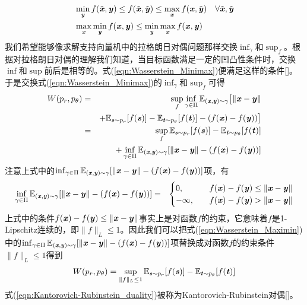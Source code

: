 \begin{eqnarray}
&\min_{\Vy} f(\tilde{\Vx},\Vy) \leq f(\tilde{\Vx},\tilde{\Vy}) \leq \max_{\Vx} f(\Vx,\tilde{\Vy}) \quad \forall \tilde{\Vx},\tilde{\Vy} \\
&\max_{\Vx}\min_{\Vy} f(\Vx,\Vy) \leq \min_{\Vy}\max_{\Vx} f(\Vx,\Vy)
\end{eqnarray}
我们希望能够像求解支持向量机中的拉格朗日对偶问题那样交换$\inf_{\gamma}$和$\sup_{f}$。根据对拉格朗日对偶的理解我们知道，当目标函数满足一定的凹凸性条件时，交换$\inf$和$\sup$前后是相等的。式(\ref{eqn:Wasserstein_Minimax})便满足这样的条件[\cite{Villani07p}]。于是交换式(\ref{eqn:Wasserstein_Minimax})的$\inf_{\gamma}$和$\sup_{f}$可得
\begin{eqnarray}
W(p_{r},p_{\theta})
&=&  \sup_{f} \inf_{\gamma\in\Pi}\SetE_{(\Vx,\Vy)\sim\gamma}\big{[}\|\Vx-\Vy\| \nonumber\\ 
&& + \SetE_{\Vs\sim p_{r}}[f(\Vs)] - \SetE_{\Vt\sim p_{\theta}}[f(\Vt)] - (f(\Vx)-f(\Vy))\big{]}\\
&=& \sup_{f} \SetE_{\Vs\sim p_{r}}[f(\Vs)] - \SetE_{\Vt\sim p_{\theta}}[f(\Vt)] \nonumber\\
&& + \inf_{\gamma\in\Pi} \SetE_{(\Vx,\Vy)\sim\gamma}[\|\Vx-\Vy\| - (f(\Vx)-f(\Vy))] \label{eqn:Wasserstein_Maximin}
\end{eqnarray}
注意上式中的$\inf_{\gamma\in\Pi} \SetE_{(\Vx,\Vy)\sim\gamma}[\|\Vx-\Vy\| - (f(\Vx)-f(\Vy))]$项，有
\begin{eqnarray}
\inf_{\gamma\in\Pi} \SetE_{(\Vx,\Vy)\sim\gamma}[\|\Vx-\Vy\| - (f(\Vx)-f(\Vy))]
&=&
\begin{cases}
0, \quad &f(\Vx)-f(\Vy)\leq\|\Vx-\Vy\|\\
-\infty, \quad &f(\Vx)-f(\Vy)>\|\Vx-\Vy\|\\
\end{cases}
\end{eqnarray}
上式中的条件$f(\Vx)-f(\Vy)\leq\|\Vx-\Vy\|$事实上是对函数$f$的约束，它意味着$f$是1-Lipschitz连续的，即$\|f\|_{L}\leq1$。因此我们可以把式(\ref{eqn:Wasserstein_Maximin})中的$\inf_{\gamma\in\Pi} \SetE_{(\Vx,\Vy)\sim\gamma}[\|\Vx-\Vy\| - (f(\Vx)-f(\Vy))]$项替换成对函数$f$的约束条件$\|f\|_{L}\leq1$得到
\begin{eqnarray}
W(p_{r},p_{\theta}) = \sup_{\|f\|_{L}\leq1} \SetE_{\Vs\sim p_{r}}[f(\Vs)] - \SetE_{\Vt\sim p_{\theta}}[f(\Vt)] \label{eqn:Kantorovich-Rubinstein_duality}
\end{eqnarray}
式(\ref{eqn:Kantorovich-Rubinstein_duality})被称为Kantorovich-Rubinstein对偶[\cite{Villani07p}]。

